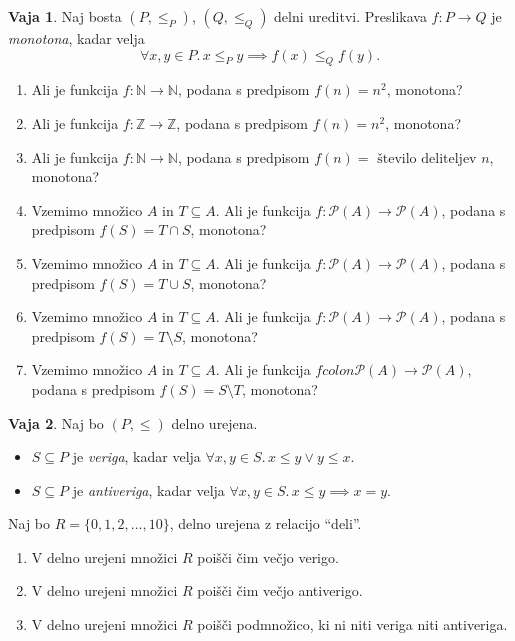 \documentclass{article}
\newcommand{\all}[1]{\forall #1 .\,}
\newcommand{\NN}{\mathbb{N}}
\newcommand{\ZZ}{\mathbb{Z}}
\theoremstyle{definition}
\newtheorem{vaja}{Vaja}
\begin{document}
\begin{vaja}
  Naj bosta $(P, \leq_P)$, $(Q, \leq_Q)$ delni ureditvi. Preslikava $f\colon P \to Q$ je \emph{monotona}, kadar velja
  \begin{equation}
    \all{x, y \in P}{x \leq_P y \implies f(x) \leq_Q f(y)}.
  \end{equation}
  \begin{enumerate}
    \item
      Ali je funkcija $f \colon \NN \to \NN$, podana s predpisom $f(n) = n^2$, monotona?
    \item
      Ali je funkcija $f \colon \ZZ \to \ZZ$, podana s predpisom $f(n) = n^2$, monotona?
    \item
      Ali je funkcija $f \colon \NN \to \NN$, podana s predpisom $f(n) = \text{ število deliteljev $n$}$, monotona?
    \item
      Vzemimo množico $A$ in $T \subseteq A$. Ali je funkcija $f \colon \mathcal{P}(A) \to \mathcal{P}(A)$, podana s predpisom $f(S) = T \cap S$, monotona?
    \item
      Vzemimo množico $A$ in $T \subseteq A$. Ali je funkcija $f\colon \mathcal{P}(A) \to \mathcal{P}(A)$, podana s predpisom $f(S) = T \cup S$, monotona?
    \item
      Vzemimo množico $A$ in $T \subseteq A$. Ali je funkcija $f\colon \mathcal{P}(A) \to \mathcal{P}(A)$, podana s predpisom $f(S) = T \setminus S$, monotona?
    \item
      Vzemimo množico $A$ in $T \subseteq A$. Ali je funkcija $fcolon \mathcal{P}(A) \to \mathcal{P}(A)$, podana s predpisom $f(S) = S \setminus T$, monotona?
  \end{enumerate}
\end{vaja}

\begin{vaja}
  Naj bo $(P, \leq)$ delno urejena.
  \begin{itemize}
    \item
      $S \subseteq P$ je \emph{veriga}, kadar velja $\all{x, y \in S}{x \leq y \lor y \leq x}$.
    \item
      $S \subseteq P$ je \emph{antiveriga}, kadar velja $\all{x, y \in S}{x \leq y \implies x = y}$.
  \end{itemize}

  Naj bo $R = \{0, 1, 2, \ldots, 10\}$, delno urejena z relacijo "`deli"'.
  \begin{enumerate}
    \item
      V delno urejeni množici $R$ poišči čim večjo verigo.
    \item
      V delno urejeni množici $R$ poišči čim večjo antiverigo.
    \item
      V delno urejeni množici $R$ poišči podmnožico, ki ni niti veriga niti antiveriga.
  \end{enumerate}
\end{vaja}
\end{document}
